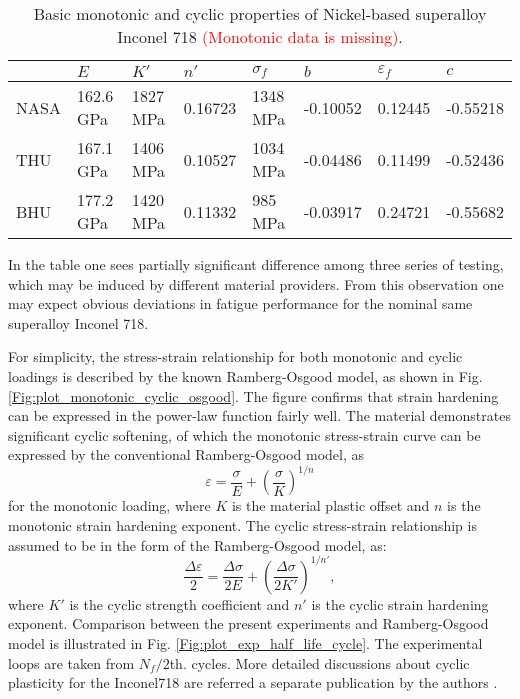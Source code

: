 \documentclass[preprint,5p,twocolumn,11pt,sort&compress]{elsarticle}
\newcommand{\marked}[1]{\textcolor{red}{#1}}
\begin{document}
\begin{table*}[htbp]
  \centering
  \caption{Basic monotonic and cyclic properties of Nickel-based superalloy Inconel 718 \marked{(Monotonic data is missing)}.}
    \begin{tabular}{llllllll}
    \hline
          & $E$     & $K'$     & $n'$     & $\sigma_f$    & $b$     & $\varepsilon_f$    & $c$ \\
    \hline
    NASA \cite{kim1988elevated, nelson1992creep}  & 162.6 GPa & 1827 MPa  & 0.16723 & 1348 MPa & -0.10052 & 0.12445 & -0.55218 \\
    THU   & 167.1 GPa & 1406 MPa  & 0.10527 & 1034 MPa & -0.04486 & 0.11499 & -0.52436 \\
    BHU \cite{Mahobia2014}   & 177.2 GPa & 1420 MPa  & 0.11332 & 985 MPa & -0.03917 & 0.24721 & -0.55682 \\
    \hline
    \end{tabular}%
  \label{tab:MechanicalProperties}%
\end{table*}%

In the table one sees partially significant difference among three series of testing, which may be induced by different material providers.  From this observation one may expect obvious deviations in fatigue performance for the nominal same superalloy Inconel 718.

For simplicity, the stress-strain relationship for both monotonic and cyclic loadings is described by the known Ramberg-Osgood model, as shown in Fig. \ref{Fig:plot_monotonic_cyclic_osgood}. The figure confirms that strain hardening can be expressed in the power-law function fairly well. The material demonstrates significant cyclic softening, of which the monotonic stress-strain curve can be expressed by the conventional Ramberg-Osgood model, as
\begin{equation}
{\varepsilon } = \frac{{\sigma }}{{E}} + {\left( {\frac{{\sigma }}{{K}}} \right)^{1/n}}
\end{equation}
for the monotonic loading, where $K$ is the material plastic offset and $n$ is the monotonic strain hardening exponent.
The cyclic stress-strain relationship is assumed to be in the form of the Ramberg-Osgood model, as:
\begin{equation}
\frac{{\Delta \varepsilon }}{2} = \frac{{\Delta \sigma }}{{2E}} + {\left( {\frac{{\Delta \sigma }}{{2K'}}} \right)^{1/n'}},
\end{equation}
where $K'$ is the cyclic strength coefficient and $n'$ is the cyclic strain hardening exponent.
Comparison between the present experiments and Ramberg-Osgood model is illustrated in Fig. \ref{Fig:plot_exp_half_life_cycle}. The experimental loops are taken from $N_f/2$th. cycles.
More detailed discussions about cyclic plasticity for the Inconel718 are referred a separate publication by the authors \cite{Sun2017}.
\end{document}
